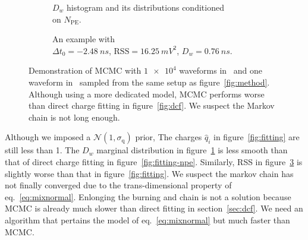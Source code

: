 \begin{figure}[H]
  \begin{subfigure}{.5\textwidth}
    \centering
    \resizebox{\textwidth}{!}{}
    \caption{\label{fig:mcmc-npe} $D_w$ histogram and its distributions conditioned \\ on $N_{\mathrm{PE}}$.}
  \end{subfigure}
  \begin{subfigure}{.5\textwidth}
    \centering
    \resizebox{\textwidth}{!}{}
    \caption{\label{fig:mcmc}An example with \\ $\Delta{t_0}=\SI{-2.48}{ns}$, $\mathrm{RSS}=\SI{16.25}{mV^2}$, $D_w=\SI{0.76}{ns}$.}
  \end{subfigure}
  \caption{Demonstration of MCMC with $\num[retain-unity-mantissa=false]{1e4}$ waveforms in~ and one waveform in~ sampled from the same setup as figure~\ref{fig:method}.  Although using a more dedicated model, MCMC performs worse than direct charge fitting in figure~\ref{fig:dcf}. We suspect the Markov chain is not long enough.}
\end{figure}
Although we imposed a $\mathcal{N}(1, \sigma_\mathrm{q})$ prior, The charges $\hat{q}_i$ in figure~\ref{fig:fitting} are still less than 1.  The $D_w$ marginal distribution in figure~\ref{fig:mcmc-npe} is less smooth than that of direct charge fitting in figure~\ref{fig:fitting-npe}.  Similarly, RSS in figure~\ref{fig:mcmc} is slightly worse than that in figure~\ref{fig:fitting}.  We suspect the markov chain has not finally converged due to the trans-dimensional property of eq.~\eqref{eq:mixnormal}.  Enlonging the burning and chain is not a solution because MCMC is already much slower than direct fitting in section~\ref{sec:dcf}.  We need an algorithm that pertains the model of eq.~\eqref{eq:mixnormal} but much faster than MCMC.

